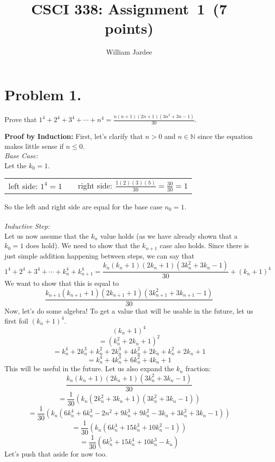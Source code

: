 \documentclass[11pt]{article}
\begin{document}
\date{}

\title{CSCI 338: Assignment~1~(7 points)}

\author{William Jardee}

\maketitle
 
\section*{Problem 1.}

\noindent
Prove that $1^4 + 2^4 + 3^4 + \cdots +n^4 = \frac{n(n+1)(2n+1)(3n^2 +3n -1)}{30}$.
\newline
\newline
    
{\bf Proof by Induction:}
\newline
First, let's clarify that $n > 0$ and $n\in \mathbb{N}$ since the equation makes little sense if $n\leq 0$.\\

\noindent
{\em Base Case: } \\
Let the $k_0 = 1$.\\
\begin{center}
\begin{tabular}{c c c}
left side: $1^4 = 1$  & \quad \quad &  right side: $ \frac{1(2)(3)(5)}{30} = \frac{30}{30} = 1$\\
\end{tabular}
\end{center}
So the left and right side are equal for the base case $n_0 = 1$.\\
\\\noindent
{\em Inductive Step: } \\
Let us now assume that the $k_n$ value holds (as we have already shown that a $k_0 =1$ does hold). We need to show that the $k_{n+1}$ case also holds. Since there is just simple addition happening between steps, we can say that
\[1^4 + 2^4 + 3^4 + \cdots + k_n^4 + k_{n+1}^4 = \frac{k_n(k_n+1)(2k_n+1)(3k_n^2+3k_n-1)}{30} + (k_n+1)^4\]
We want to show that this is equal to 
\[\frac{k_{n+1}(k_{n+1}+1)(2k_{n+1}+1)(3k_{n+1}^2+3k_{n+1}-1)}{30}\]
Now, let's do some algebra! To get a value that will be usable in the future, let us first foil $(k_n+1)^4$.\\
\[(k_n+1)^4\]
\[= (k_n^2 +2k_n +1)^2\]
\[= k_n^4+2k_n^3+k_n^2+2k_n^3+4k_n^2+2k_n+k_n^2+2k_n+1\]
\[= k_n^4 +4k_n^3 +6k_n^2+4k_n+1\]
This will be useful in the future. Let us also expand the $k_n$ fraction:
\[\frac{k_n(k_n+1)(2k_n+1)(3k_n^2+3k_n-1)}{30}\]
\[=\frac{1}{30}(k_n(2k_n^2 +3k_n +1)(3k_n^2+3k_n-1))\]
\[=\frac{1}{30}(k_n(6k_n^4 +6k_n^3 -2n^2 +9k_n^3 +9k_n^2 -3k_n +3k_n^2 +3k_n -1))\]
\[=\frac{1}{30}(k_n(6k_n^4 +15k_n^3 +10k_n^2 -1))\]
\[=\frac{1}{30}(6k_n^5 +15k_n^4 +10k_n^3 -k_n)\]
Let's push that aside for now too. \\
\end{document}
